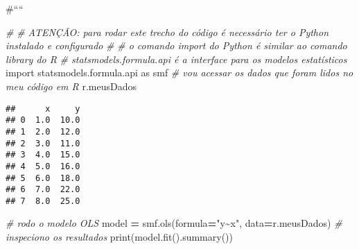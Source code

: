 \documentclass[
]{book}
\newenvironment{Shaded}{\begin{snugshade}}{\end{snugshade}}
\newcommand{\BuiltInTok}[1]{#1}
\newcommand{\CommentTok}[1]{\textcolor[rgb]{0.56,0.35,0.01}{\textit{#1}}}
\newcommand{\ImportTok}[1]{#1}
\newcommand{\NormalTok}[1]{#1}
\newcommand{\OperatorTok}[1]{\textcolor[rgb]{0.81,0.36,0.00}{\textbf{#1}}}
\newcommand{\StringTok}[1]{\textcolor[rgb]{0.31,0.60,0.02}{#1}}
\begin{document}
\#````

\begin{Shaded}
\begin{Highlighting}[]
\CommentTok{\#}
\CommentTok{\# ATENÇÃO: para rodar este trecho do código é necessário ter o Python instalado e configurado}
\CommentTok{\#}
\CommentTok{\# o comando import do Python é similar ao comando library do R}
\CommentTok{\# statsmodels.formula.api é a interface para os modelos estatísticos}
\ImportTok{import}\NormalTok{ statsmodels.formula.api }\ImportTok{as}\NormalTok{ smf}
\CommentTok{\# vou acessar os dados que foram lidos no meu código em R}
\NormalTok{r.meusDados}
\end{Highlighting}
\end{Shaded}

\begin{verbatim}
##      x     y
## 0  1.0  10.0
## 1  2.0  12.0
## 2  3.0  11.0
## 3  4.0  15.0
## 4  5.0  16.0
## 5  6.0  18.0
## 6  7.0  22.0
## 7  8.0  25.0
\end{verbatim}

\begin{Shaded}
\begin{Highlighting}[]
\CommentTok{\# rodo o modelo OLS}
\NormalTok{model }\OperatorTok{=}\NormalTok{ smf.ols(formula}\OperatorTok{=}\StringTok{"y\textasciitilde{}x"}\NormalTok{, data}\OperatorTok{=}\NormalTok{r.meusDados)}
\CommentTok{\# inspeciono os resultados}
\BuiltInTok{print}\NormalTok{(model.fit().summary())}
\end{Highlighting}
\end{Shaded}
\end{document}
